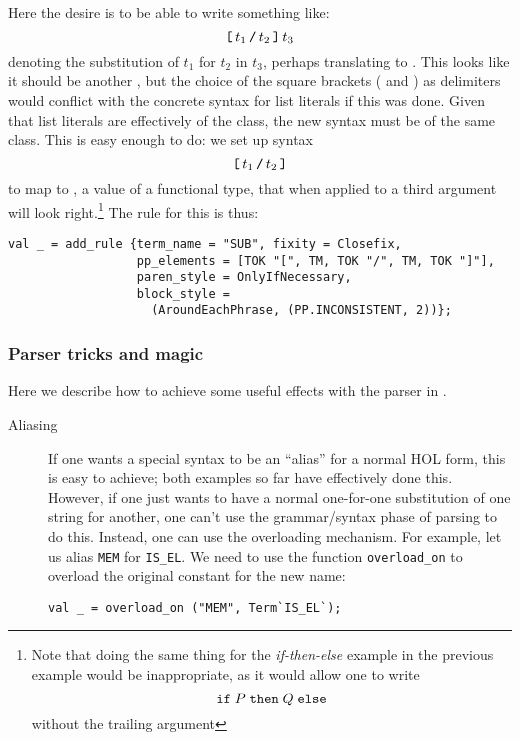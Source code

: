 { Here the desire is to be able
  to write something like:
  \[
  \mbox{\texttt{[}}\,t_1\,\mbox{\texttt{/}}\,t_2\,\mbox{\texttt{]}}\,t_3
  \]
  denoting the substitution of $t_1$ for $t_2$ in $t_3$, perhaps
  translating to .  This looks
like it should be another , but the choice of the
square brackets (\holtxt{[} and \holtxt{]}) as delimiters would
conflict with the concrete syntax for list literals if this was done.
Given that list literals are effectively of the 
class, the new syntax must be of the same class.  This is easy enough
to do: we set up syntax
\[
\holtxt{[}\,t_1\,\holtxt{/}\,t_2\,\holtxt{]}
\]
to map to , a value of a functional
type, that when applied to a third argument will look
right.\footnote{Note that doing the same thing for the
  \textit{if-then-else} example in the previous example would be
  inappropriate, as it would allow one to write \[
  \holtxt{if}\;P\;\holtxt{then}\;Q\;\holtxt{else}
  \] without the trailing argument}
  The rule for this is thus:
\begin{verbatim}
val _ = add_rule {term_name = "SUB", fixity = Closefix,
                  pp_elements = [TOK "[", TM, TOK "/", TM, TOK "]"],
                  paren_style = OnlyIfNecessary,
                  block_style =
                    (AroundEachPhrase, (PP.INCONSISTENT, 2))};
\end{verbatim}

\subsubsection{Parser tricks and magic}

Here we describe how to achieve some useful effects with the
parser in \HOL{}.

\begin{description}

\item[Aliasing] If one wants a special syntax to be an ``alias'' for a
  normal HOL form, this is easy to achieve; both examples so far have
  effectively done this.  However, if one just wants to have a normal
  one-for-one substitution of one string for another, one can't use
  the grammar/syntax phase of parsing to do this.  Instead, one can
  use the overloading mechanism.  For example, let us alias
  \texttt{MEM} for \texttt{IS\_EL}.  We need to use the function
  \texttt{overload\_on} to overload the original constant for the new
  name:
\begin{verbatim}
val _ = overload_on ("MEM", Term`IS_EL`);
\end{verbatim}


\end{description}}
